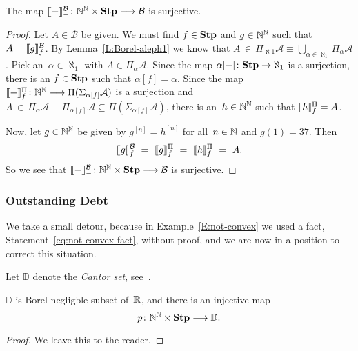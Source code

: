\documentclass[main.tex]{subfiles}
\begin{document}
\begin{prop}
\label{P:bhier-surjective}
The map $\decode{-}^\mathcal{B}_{-}\colon \N^\N\times \Stump
\longrightarrow \mathcal{B}$
is surjective.
\end{prop}
\begin{proof}
Let $A\in\mathcal{B}$ be given.
We must find $f\in\mathbf{Stp}$
and $g\in\mathbb{N}^{\mathbb{N}}$ such that $A=\decode{g}^{\mathcal{B}}_f$.
By Lemma~\ref{L:Borel-aleph1}
we know that $A\,\in\,\Pi_{\aleph1} \mathcal{A}
\equiv \bigcup_{\alpha\in\aleph_1} \Pi_\alpha\mathcal{A}$.
Pick an~$\alpha\in \aleph_1$ with $A\in \Pi_\alpha \mathcal{A}$.
Since the map $\alpha[-]\colon \mathbf{Stp} \rightarrow \aleph_1$
is a surjection,
there is an $f\in\mathbf{Stp}$
such that $\alpha[f] = \alpha$.
Since the map $\decode{-}^{\Pi}_{f}
\colon \N^\N \longrightarrow \Pi(\Sigma_{\alpha[f]} \mathcal{A})$
is a surjection
and $A\,\in\, \Pi_{\alpha} \mathcal{A}
\equiv \Pi_{\alpha[f]}\mathcal{A}
\subseteq \Pi(\Sigma_{\alpha[f]}\mathcal{A})$,
there is an~$h\in \mathbb{N}^{\mathbb{N}}$
such that $\decode{h}^{\Pi}_f = A$.

Now, let $g\in\mathbb{N}^{\mathbb{N}}$ be given by
$g^{[n]} = h^{[n]}$ for all~$n\in\mathbb{N}$
and $g(1)= 37$.
Then
\begin{equation*}
\decode{g}^{\mathcal{B}}_f
\ =\ 
\decode{g}^{\Pi}_f
\ =\ 
\decode{h}^{\Pi}_f
\ =\ 
A.
\end{equation*}
So we see that $\decode{-}^{\mathcal{B}}_{-}
\colon \N^\N\times\Stump\longrightarrow \mathcal{B}$
is surjective.
\end{proof}

\subsubsection{Outstanding Debt}$\,$\\
We take a small detour,
because in Example~\ref{E:not-convex}
we used a fact, Statement~\eqref{eq:not-convex-fact},
without proof,
and we are now in a position
to correct this situation.
\begin{nt}
Let $\mathbb{D}$ denote the \emph{Cantor set},
see~\cite[Examples~17.9c]{Willard70}.
\end{nt}
\begin{lem}
\label{L:bhier-disc-injection}
$\mathbb{D}$ is Borel negligble
subset of~$\mathbb{R}$,
and there is an injective map
\begin{equation*}
p\colon \mathbb{N}^{\mathbb{N}} \times \mathbf{Stp} \longrightarrow \mathbb{D}.
\end{equation*}
\end{lem}
\begin{proof}
We leave this to the reader.
\end{proof}
\end{document}
